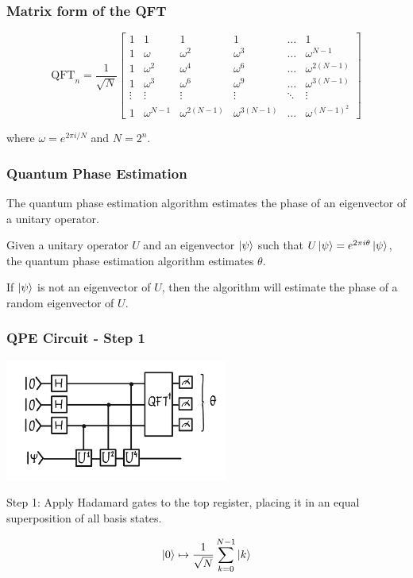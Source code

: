 \documentclass{beamer}
\begin{document}
\begin{frame}
\frametitle{Matrix form of the QFT}

$$\mathrm{QFT}_n = \frac{1}{\sqrt{N}} \begin{bmatrix}
1 & 1 & 1 & 1 & \ldots & 1 \\
1 & \omega & \omega^2 & \omega^3 & \ldots & \omega^{N-1} \\
1 & \omega^2 & \omega^4 & \omega^6 & \ldots & \omega^{2(N-1)} \\
1 & \omega^3 & \omega^6 & \omega^9 & \ldots & \omega^{3(N-1)} \\
\vdots & \vdots & \vdots & \vdots & \ddots & \vdots \\
1 & \omega^{N-1} & \omega^{2(N-1)} & \omega^{3(N-1)} & \ldots & \omega^{(N-1)^2}
\end{bmatrix}$$

where $\omega = e^{2\pi i / N}$ and $N = 2^n$.
\end{frame}



\begin{frame}
    \frametitle{Quantum Phase Estimation}

    The quantum phase estimation algorithm estimates 
    the phase of an eigenvector of a unitary operator.

    \vspace {0.5cm}

    Given a unitary operator $U$ and an eigenvector $\left| \psi \right\rangle$ such that 
    $U\left| \psi \right\rangle = e^{2\pi i \theta} \left| \psi \right\rangle$, 
    the quantum phase estimation algorithm estimates $\theta$.

    \vspace{0.5cm}

    If $\left| \psi \right\rangle$ is not an eigenvector of $U$, then the algorithm will
    estimate the phase of a random eigenvector of $U$.
\end{frame}

\begin{frame}
    \frametitle{QPE Circuit - Step 1}
    \includegraphics[height=4cm]{qpe.png}

    Step 1: Apply Hadamard gates to the top register,
    placing it in an equal superposition of all basis states.

    $$\left| 0 \right\rangle \mapsto \frac{1}{\sqrt{N}} \sum_{k=0}^{N-1} \left| k \right\rangle$$

\end{frame}
\end{document}
